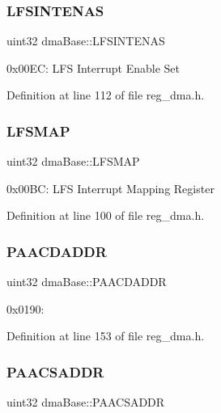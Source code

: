 \subsubsection{\texorpdfstring{L\+F\+S\+I\+N\+T\+E\+N\+AS}{LFSINTENAS}}
{\footnotesize\ttfamily uint32 dma\+Base\+::\+L\+F\+S\+I\+N\+T\+E\+N\+AS}

0x00\+EC\+: L\+FS Interrupt Enable Set 

Definition at line 112 of file reg\+\_\+dma.\+h.

\mbox{\label{structdmaBase_a55cfc088d6dcb609f000cd33097e7f5c}} 
\subsubsection{\texorpdfstring{L\+F\+S\+M\+AP}{LFSMAP}}
{\footnotesize\ttfamily uint32 dma\+Base\+::\+L\+F\+S\+M\+AP}

0x00\+BC\+: L\+FS Interrupt Mapping Register 

Definition at line 100 of file reg\+\_\+dma.\+h.

\mbox{\label{structdmaBase_a68f19a970301d6736591b4c74d021a99}} 
\subsubsection{\texorpdfstring{P\+A\+A\+C\+D\+A\+D\+DR}{PAACDADDR}}
{\footnotesize\ttfamily uint32 dma\+Base\+::\+P\+A\+A\+C\+D\+A\+D\+DR}

0x0190\+: 

Definition at line 153 of file reg\+\_\+dma.\+h.

\mbox{\label{structdmaBase_aabe83911e3f70446830de1e67d41540d}} 
\subsubsection{\texorpdfstring{P\+A\+A\+C\+S\+A\+D\+DR}{PAACSADDR}}
{\footnotesize\ttfamily uint32 dma\+Base\+::\+P\+A\+A\+C\+S\+A\+D\+DR}


